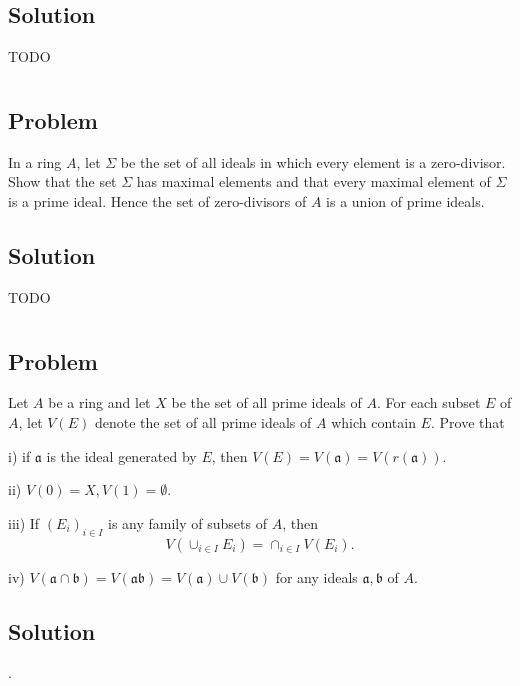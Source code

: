 \documentclass[book,12pt,oneside,openany]{memoir}
\begin{document}
\subsection{Solution}
TODO


\section{}
\subsection{Problem}
In a ring $A$, let $\Sigma$ be the set of all ideals in which every element is a zero-divisor. Show that the set $\Sigma$ has maximal elements and that every maximal element of $\Sigma$ is a prime ideal. Hence the set of zero-divisors of $A$ is a union of prime ideals.
\subsection{Solution}

TODO

\section{}
\subsection{Problem}
Let $A$ be a ring and let $X$ be the set of all prime ideals of $A$. For each subset $E$ of $A$, let $V(E)$ denote the set of all prime ideals of $A$ which contain $E$. Prove that

i) if $\mathfrak{a}$ is the ideal generated by $E$, then $V(E) = V(\mathfrak{a}) = V(r(\mathfrak{a}))$.

ii) $V(0) = X, V(1) = \emptyset$.

iii) If $(E_i)_{i \in I}$ is any family of subsets of $A$, then \[V (\cup_{i \in I} E_i ) = \cap_{i \in I} V(E_i).\]

iv) $V(\mathfrak{a} \cap \mathfrak{b}) = V(\mathfrak{a}\mathfrak{b}) = V(\mathfrak{a}) \cup V(\mathfrak{b})$ for any ideals $\mathfrak{a}, \mathfrak{b}$ of $A$.

\subsection{Solution}
.
\end{document}
